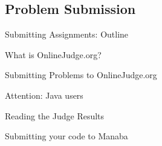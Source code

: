 \subsection{Problem Submission}
\begin{frame}{Submitting Assignments: Outline}
\end{frame}
\begin{frame}{What is OnlineJudge.org?}
\end{frame}
\begin{frame}{Submitting Problems to OnlineJudge.org}
\end{frame}
\begin{frame}{Attention: Java users}
\end{frame}
\begin{frame}{Reading the Judge Results}
\end{frame}
\begin{frame}{Submitting your code to Manaba}
\end{frame}

